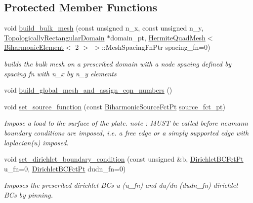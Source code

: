 \subsection*{Protected Member Functions}
\begin{DoxyCompactItemize}
\item 
void \hyperlink{classoomph_1_1BiharmonicProblem_aefd82d374a3a6f899faf752afd39ac36}{build\+\_\+bulk\+\_\+mesh} (const unsigned n\+\_\+x, const unsigned n\+\_\+y, \hyperlink{classoomph_1_1TopologicallyRectangularDomain}{Topologically\+Rectangular\+Domain} $\ast$domain\+\_\+pt, \hyperlink{classoomph_1_1HermiteQuadMesh}{Hermite\+Quad\+Mesh}$<$ \hyperlink{classoomph_1_1BiharmonicElement}{Biharmonic\+Element}$<$ 2 $>$ $>$\+::Mesh\+Spacing\+Fn\+Ptr spacing\+\_\+fn=0)
\begin{DoxyCompactList}\small\item\em builds the bulk mesh on a prescribed domain with a node spacing defined by spacing fn with n\+\_\+x by n\+\_\+y elements \end{DoxyCompactList}\item 
void \hyperlink{classoomph_1_1BiharmonicProblem_a2ed9f3c94a3609638042089251476bcf}{build\+\_\+global\+\_\+mesh\+\_\+and\+\_\+assign\+\_\+eqn\+\_\+numbers} ()
\item 
void \hyperlink{classoomph_1_1BiharmonicProblem_aed3e4068c71df9c27f561b5880b49e18}{set\+\_\+source\+\_\+function} (const \hyperlink{classoomph_1_1BiharmonicProblem_a08d7386bbae19862d6fa656b8a2ae2a0}{Biharmonic\+Source\+Fct\+Pt} \hyperlink{namespaceoomph_aaeb31b697ac413871cfe74e70c3a60b1}{source\+\_\+fct\+\_\+pt})
\begin{DoxyCompactList}\small\item\em Impose a load to the surface of the plate. note \+: M\+U\+ST be called before neumann boundary conditions are imposed, i.\+e. a free edge or a simply supported edge with laplacian(u) imposed. \end{DoxyCompactList}\item 
void \hyperlink{classoomph_1_1BiharmonicProblem_ad1d8a1b35dce481d1af72d0662110538}{set\+\_\+dirichlet\+\_\+boundary\+\_\+condition} (const unsigned \&b, \hyperlink{classoomph_1_1BiharmonicProblem_ac3e873c52bcd489bc545f3cd2c860e8f}{Dirichlet\+B\+C\+Fct\+Pt} u\+\_\+fn=0, \hyperlink{classoomph_1_1BiharmonicProblem_ac3e873c52bcd489bc545f3cd2c860e8f}{Dirichlet\+B\+C\+Fct\+Pt} dudn\+\_\+fn=0)
\begin{DoxyCompactList}\small\item\em Imposes the prescribed dirichlet B\+Cs u (u\+\_\+fn) and du/dn (dudn\+\_\+fn) dirichlet B\+Cs by \textquotesingle{}pinning\textquotesingle{}. \end{DoxyCompactList}\item 

\end{DoxyCompactItemize}

